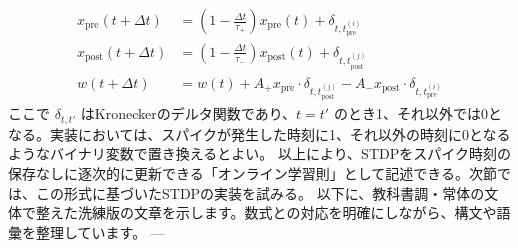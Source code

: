 \begin{align}
x_{\text{pre}}(t+\Delta t) &= \left(1 - \frac{\Delta t}{\tau_+} \right) x_{\text{pre}}(t) + \delta_{t, t_{\text{pre}}^{(i)}} \\
x_{\text{post}}(t+\Delta t) &= \left(1 - \frac{\Delta t}{\tau_-} \right) x_{\text{post}}(t) + \delta_{t, t_{\text{post}}^{(j)}} \\
w(t+\Delta t) &= w(t) + A_+ x_{\text{pre}} \cdot \delta_{t, t_{\text{post}}^{(j)}} - A_- x_{\text{post}} \cdot \delta_{t, t_{\text{pre}}^{(i)}}
\end{align}
ここで $\delta_{t, t'}$ はKroneckerのデルタ関数であり、$t = t'$ のとき1、それ以外では0となる。実装においては、スパイクが発生した時刻に1、それ以外の時刻に0となるようなバイナリ変数で置き換えるとよい。
以上により、STDPをスパイク時刻の保存なしに逐次的に更新できる「オンライン学習則」として記述できる。次節では、この形式に基づいたSTDPの実装を試みる。
以下に、教科書調・常体の文体で整えた洗練版の文章を示します。数式との対応を明確にしながら、構文や語彙を整理しています。
---
